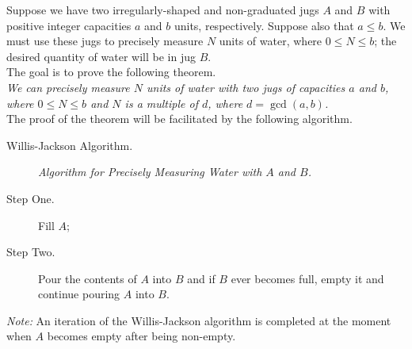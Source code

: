 \documentclass[10pt, AMS Euler]{article}
\begin{document}
	
	\\
        \\
	
	\noindent \underline{\hspace{2in}}\\
	
	\\

        \newpage
	\\
	
	  Suppose we have two irregularly-shaped and non-graduated jugs $A$ and $B$ with positive integer capacities $a$ and $b$ units, respectively.
	Suppose also that $a \leq b$.
	We must use these jugs to precisely measure $N$ units of water, where $0 \leq N \leq b$;
	the desired quantity of water will be in jug $B$.\\
	
	\noindent The goal is to prove the following theorem.\\
	
	 \emph{We can precisely measure $N$ units of water with two jugs of capacities $a$ and $b$, where $0 \leq N \leq b$
		and $N$ is a multiple of $d$, where $d = \gcd(a,b)$.}\\
	
	\noindent The proof of the theorem will be facilitated by the following algorithm.  
	
	\begin{description}
		\item[Willis-Jackson Algorithm.] \emph{Algorithm for Precisely Measuring Water with $A$ and $B$.}
		\item[Step One.] Fill $A$;
		\item[Step Two.] Pour the contents of $A$ into $B$ and if $B$ ever becomes full, empty it and continue pouring $A$ into $B$.
	\end{description}
	\emph{Note:} An iteration of the Willis-Jackson algorithm is completed at the moment when $A$ becomes empty after being non-empty.\\
	
\end{document}
